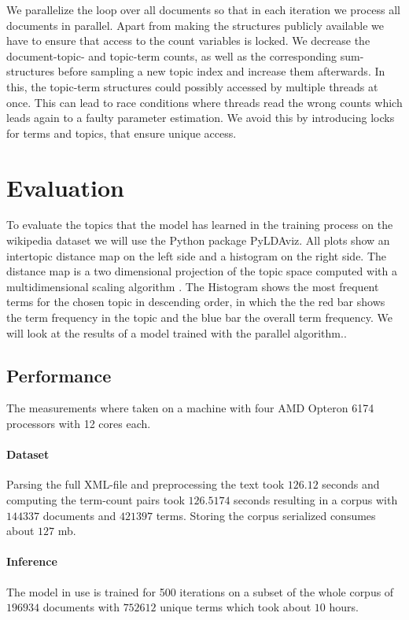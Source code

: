 \documentclass[12 pt,twopage]{article}
\begin{document}
We parallelize the loop over all documents so that in each iteration we process all documents in parallel.
Apart from making the structures publicly available we have to ensure that access to the count variables is locked. We decrease the document-topic- and topic-term counts, as well as the corresponding sum-structures before sampling a new topic index and increase them afterwards. In this, the topic-term structures could possibly accessed by multiple threads at once. This can lead to race conditions where threads read the wrong counts which leads again to a faulty parameter estimation. We avoid this by introducing locks for terms and topics, that ensure unique access.

\section{Evaluation}
To evaluate the topics that the model has learned in the training process on the wikipedia dataset we will use the Python package PyLDAviz. All plots show an intertopic distance map on the left side and a histogram on the right side. The distance map is a two dimensional projection of the topic space computed with a multidimensional scaling algorithm \cite{Sievert2014}. The Histogram shows the most frequent terms for the chosen topic in descending order, in which the the red bar shows the term frequency in the topic and the blue bar the overall term frequency. We will look at the results of a model trained with the parallel algorithm..

\subsection{Performance}
The measurements where taken on a machine with four AMD Opteron 6174 processors with 12 cores each.
\paragraph{Dataset}
Parsing the full XML-file and preprocessing the text took \(126.12\) seconds and computing the term-count pairs took \(126.5174\) seconds resulting in a corpus with \(144337\) documents and \(421397\) terms. Storing the corpus serialized consumes about \(127\) mb.
\paragraph{Inference}
The model in use is trained for 500 iterations  on a subset of the whole corpus of \( 196934 \) documents with \( 752612 \) unique terms which took about \(10\) hours.
\end{document}
